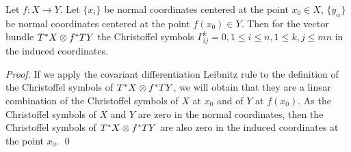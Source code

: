 \documentclass[twocolumn]{svjour3}          %
\newcommand{\TangentBundle}[1]{T{#1}}
\newcommand{\CotangentBundle}[1]{\tensor*{T}{^{*}}{#1}}
\newcommand {\Preimage}[2]{{#2}^*{#1}}
\newcommand \TPreimage[2]{\Preimage{\TangentBundle{#1}}{#2}}
\newcommand {\DiffSpace}[3]{\CotangentBundle{#1}\otimes \TPreimage{#2}{#3}}
\begin{document}
\begin{lemma} \label{ChristoffelSymbolsDiffSpace}
Let $f:X\to Y$. Let $\{x_i\}$ be normal coordinates centered at the point $x_0 \in X$, $\{y_{\alpha}\}$ be normal coordinates centered at the point $f(x_0) \in Y$. Then for the vector bundle $\DiffSpace{X}{Y}{f}$ the Christoffel symbols $\Gamma^k_{ij}=0, 1 \le i \le n, 1 \le k,j \le mn$ in the induced coordinates.
\end{lemma}
\begin{proof}
If we apply the covariant differentiation Leibnitz rule to the definition of the Christoffel symbols of $\DiffSpace{X}{Y}{f}$, we will obtain that they are a linear combination of the Christoffel symbols of $X$ at $x_0$ and of $Y$ at $f(x_0)$. As the Christoffel symbols of $X$ and $Y$ are zero in the normal coordinates, then the Christoffel symbols of $\DiffSpace{X}{Y}{f}$ are also zero in the induced coordinates at the point $x_0$. \qed
\end{proof}
\end{document}
